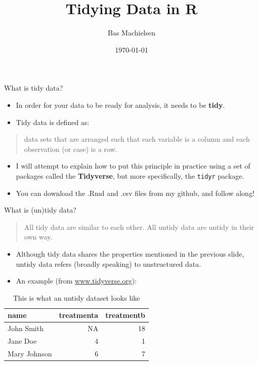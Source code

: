 \documentclass[10pt,ignorenonframetext,]{beamer}
\title{Tidying Data in R}
\author{Bas Machielsen}
\institute{Utrecht University - R Cafe}
\date{\today}
\begin{document}
\frame{\titlepage}

\begin{frame}[fragile]{What is tidy data?}
\protect\hypertarget{what-is-tidy-data}{}

\begin{itemize}
\item
  In order for your data to be ready for analysis, it needs to be
  \textbf{tidy}.
\item
  Tidy data is defined as:
\end{itemize}

\begin{quote}
data sets that are arranged such that each variable is a column and each
observation (or case) is a row.
\end{quote}

\begin{itemize}
\item
  I will attempt to explain how to put this principle in practice using
  a set of packages called the \textbf{Tidyverse}, but more
  specifically, the \texttt{tidyr} package.
\item
  You can download the .Rmd and .csv files from my github, and follow
  along!
\end{itemize}

\end{frame}

\begin{frame}{What is (un)tidy data?}
\protect\hypertarget{what-is-untidy-data}{}

\begin{quote}
All tidy data are similar to each other. All untidy data are untidy in
their own way.
\end{quote}

\begin{itemize}
\item
  Although tidy data shares the properties mentioned in the previous
  slide, untidy data refers (broadly speaking) to unstructured data.
\item
  An example (from \url{www.tidyverse.org}):
\end{itemize}

\begin{table}

\caption{\label{tab:unnamed-chunk-1}This is what an untidy dataset looks like}
\centering
\begin{tabular}[t]{lrr}
\toprule
name & treatmenta & treatmentb\\
\midrule
\rowcolor{gray!6}  John Smith & NA & 18\\
Jane Doe & 4 & 1\\
\rowcolor{gray!6}  Mary Johnson & 6 & 7\\
\bottomrule
\end{tabular}
\end{table}

\end{frame}
\end{document}
